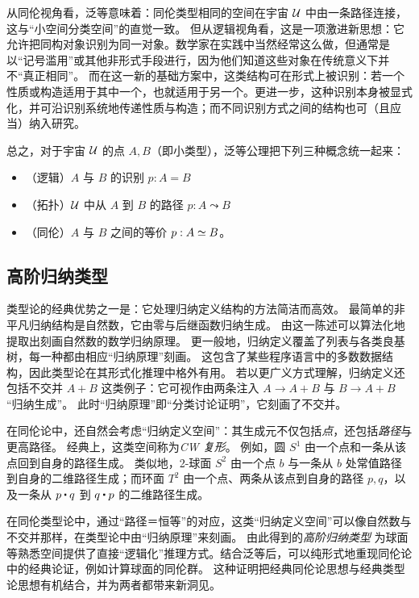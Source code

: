 从同伦视角看，泛等意味着：同伦类型相同的空间在宇宙 $\mathcal{U}$ 中由一条路径连接，这与“小空间分类空间”的直觉一致。
但从逻辑视角看，这是一项激进新思想：它允许把同构对象识别为同一对象。数学家在实践中当然经常这么做，但通常是以“记号滥用”或其他非形式手段进行，因为他们知道这些对象在传统意义下并不“真正相同”。
而在这一新的基础方案中，这类结构可在形式上被识别：若一个性质或构造适用于其中一个，也就适用于另一个。更进一步，这种识别本身被显式化，并可沿识别系统地传递性质与构造；而不同识别方式之间的结构也可（且应当）纳入研究。

总之，对于宇宙 $\mathcal{U}$ 的点 $A,B$（即小类型），泛等公理把下列三种概念统一起来：
\begin{itemize}
\item（逻辑）$A$ 与 $B$ 的识别 $p:A=B$
\item（拓扑）$\mathcal{U}$ 中从 $A$ 到 $B$ 的路径 $p:A \leadsto B$
\item（同伦）$A$ 与 $B$ 之间的等价 $p:A \simeq B$。
\end{itemize}

\subsection*{高阶归纳类型}%

类型论的经典优势之一是：它处理归纳定义结构的方法简洁而高效。
最简单的非平凡归纳结构是自然数，它由零与后继函数归纳生成。
由这一陈述可以算法化地提取出刻画自然数的数学归纳原理。
更一般地，归纳定义覆盖了列表与各类良基树，每一种都由相应“归纳原理”刻画。
这包含了某些程序语言中的多数数据结构，因此类型论在其形式化推理中格外有用。
若以更广义方式理解，归纳定义还包括不交并 $A+B$ 这类例子：它可视作由两条注入 $A\to A+B$ 与 $B\to A+B$ “归纳生成”。
此时“归纳原理”即“分类讨论证明”，它刻画了不交并。

在同伦论中，还自然会考虑“归纳定义空间”：其生成元不仅包括\emph{点}，还包括\emph{路径}与更高路径。
经典上，这类空间称为\emph{CW 复形}。
%
例如，圆 $S^1$ 由一个点和一条从该点回到自身的路径生成。
类似地，2-球面 $S^2$ 由一个点 $b$ 与一条从 $b$ 处常值路径到自身的二维路径生成；而环面 $T^2$ 由一个点、两条从该点到自身的路径 $p,q$，以及一条从 $p\ct q$ 到 $q\ct p$ 的二维路径生成。

在同伦类型论中，通过“路径＝恒等”的对应，这类“归纳定义空间”可以像自然数与不交并那样，在类型论中由“归纳原理”来刻画。
由此得到的\emph{高阶归纳类型}
%
为球面等熟悉空间提供了直接“逻辑化”推理方式。结合泛等后，可以纯形式地重现同伦论中的经典论证，例如计算球面的同伦群。
这种证明把经典同伦论思想与经典类型论思想有机结合，并为两者都带来新洞见。

